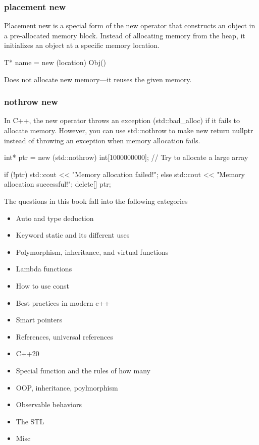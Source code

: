 \documentclass{report}
\begin{document}
    \bigbreak \noindent 
    \subsubsection{placement new}
    \bigbreak \noindent 
    Placement new is a special form of the new operator that constructs an object in a pre-allocated memory block. Instead of allocating memory from the heap, it initializes an object at a specific memory location.
    \bigbreak \noindent 
    \begin{cppcode}
        T* name = new (location) Obj()
    \end{cppcode}
    \bigbreak \noindent 
    Does not allocate new memory—it reuses the given memory.

    \bigbreak \noindent 
    \subsubsection{nothrow new}
    \bigbreak \noindent 
    In C++, the new operator throws an exception (std::bad\_alloc) if it fails to allocate memory. However, you can use std::nothrow to make new return nullptr instead of throwing an exception when memory allocation fails.
    \bigbreak \noindent 
    \begin{cppcode}
        int* ptr = new (std::nothrow) int[1000000000]; // Try to allocate a large array

        if (!ptr) {
            std::cout << "Memory allocation failed!\n";
        } else {
            std::cout << "Memory allocation successful!\n";
            delete[] ptr;
        }
    \end{cppcode}

\pagebreak 
{}
\bigbreak \noindent 
The questions in this book fall into the following categories
\begin{itemize}
    \item Auto and type deduction
    \item Keyword static and its different uses
    \item Polymorphism, inheritance, and virtual functions
    \item Lambda functions
    \item How to use const
    \item Best practices in modern c++
    \item Smart pointers
    \item References, universal references
    \item C++20
    \item Special function and the rules of how many
    \item OOP, inheritance, poylmorphism
    \item Observable behaviors
    \item The STL
    \item Misc
\end{itemize}
\end{document}

